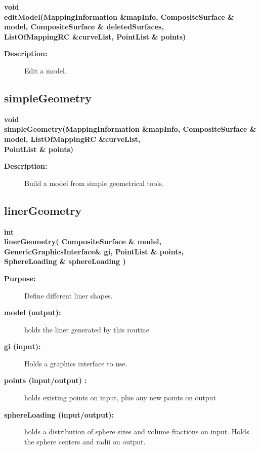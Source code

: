 \begin{flushleft} \textbf{%
void  \\ 
\settowidth{\ModelBuilderIncludeArgIndent}{editModel(}%
editModel(MappingInformation \&mapInfo, CompositeSurface \& model, CompositeSurface \& deletedSurfaces,\\ 
\hspace{\ModelBuilderIncludeArgIndent}ListOfMappingRC \&curveList, PointList \& points)
}\end{flushleft}
\begin{description}
\item[{\bf Description:}] 
    Edit a model.
\end{description}
\subsection{simpleGeometry}
 
\begin{flushleft} \textbf{%
void  \\ 
\settowidth{\ModelBuilderIncludeArgIndent}{simpleGeometry(}%
simpleGeometry(MappingInformation \&mapInfo, CompositeSurface \& model, ListOfMappingRC \&curveList,\\ 
\hspace{\ModelBuilderIncludeArgIndent}PointList \& points)
}\end{flushleft}
\begin{description}
\item[{\bf Description:}] 
    Build a model from simple geometrical tools.
\end{description}
\subsection{linerGeometry}
 
\begin{flushleft} \textbf{%
int  \\ 
\settowidth{\ModelBuilderIncludeArgIndent}{linerGeometry(}%
linerGeometry( CompositeSurface \& model, GenericGraphicsInterface\& gi, PointList \& points,\\ 
\hspace{\ModelBuilderIncludeArgIndent}SphereLoading \& sphereLoading )
}\end{flushleft}
\begin{description}
\item[{\bf Purpose:}]  
      Define different liner shapes.

\item[{\bf model (output):}]  holds the liner generated by this routine
\item[{\bf gi (input):}]  Holds a graphics interface to use.
\item[{\bf points (input/output) :}]  holds existing points on input, plus any new points on output
\item[{\bf sphereLoading (input/output):}]  holds a distribution of sphere sizes and volume fractions on input.
            Holds the sphere centers and radii on output.
\end{description}
